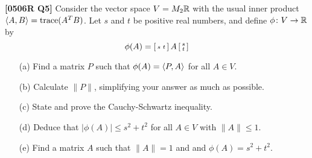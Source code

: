 \documentclass[a4paper]{article}
\begin{document}
\begin{problem}\textbf{[0506R Q5]}
 Consider the vector space $V=M_2{\mathbb{R}}$ with the usual inner product
 $\langle A,B\rangle=\operatorname{trace}(A^TB)$.  Let $s$ and $t$ be positive real numbers, and
 define $\phi\colon V\to{\mathbb{R}}$ by
 \[ \phi(A)=\left[\begin{smallmatrix} s&t\end{smallmatrix}\right] A\left[\begin{smallmatrix} s\\t\end{smallmatrix}\right] \]
 \begin{itemize}
  \item[(a)] Find a matrix $P$ such that $\phi(A)=\langle P,A\rangle$ for all
   $A\in V$.  
  \item[(b)] Calculate $\|P\|$, simplifying your answer as much as
   possible.  
  \item[(c)] State and prove the Cauchy-Schwartz inequality. 
  \item[(d)] Deduce that $|\phi(A)|\leq s^2+t^2$ for all $A\in V$
   with $\|A\|\leq 1$.  
  \item[(e)] Find a matrix $A$ such that $\|A\|=1$ and and
   $\phi(A)=s^2+t^2$. 
 \end{itemize}
\end{problem}
\end{document}
